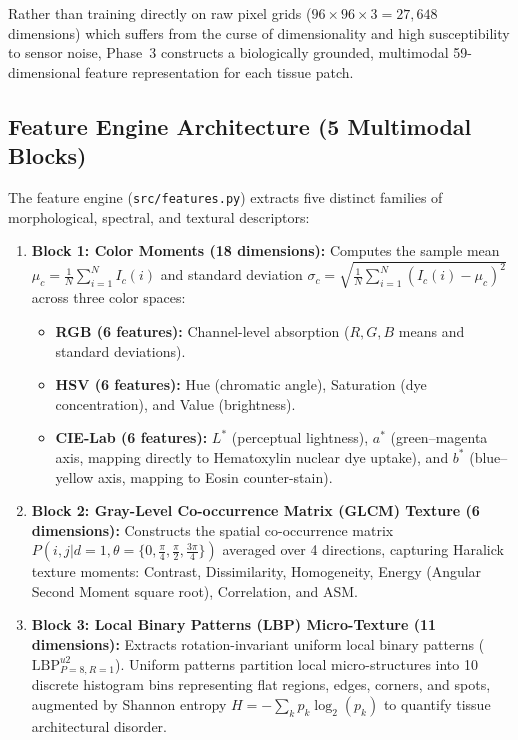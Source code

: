 \documentclass[11pt,a4paper]{article}
\begin{document}
Rather than training directly on raw pixel grids ($96 \times 96 \times 3 = 27,648$ dimensions) which suffers from the curse of dimensionality and high susceptibility to sensor noise, Phase~3 constructs a biologically grounded, multimodal 59-dimensional feature representation for each tissue patch.

\subsection{Feature Engine Architecture (5 Multimodal Blocks)}
The feature engine (\texttt{src/features.py}) extracts five distinct families of morphological, spectral, and textural descriptors:
\begin{enumerate}[leftmargin=*]
    \item \textbf{Block 1: Color Moments (18 dimensions):}
    Computes the sample mean $\mu_c = \frac{1}{N}\sum_{i=1}^N I_c(i)$ and standard deviation $\sigma_c = \sqrt{\frac{1}{N}\sum_{i=1}^N (I_c(i) - \mu_c)^2}$ across three color spaces:
    \begin{itemize}[noitemsep]
        \item \textbf{RGB (6 features):} Channel-level absorption ($R, G, B$ means and standard deviations).
        \item \textbf{HSV (6 features):} Hue (chromatic angle), Saturation (dye concentration), and Value (brightness).
        \item \textbf{CIE-Lab (6 features):} $L^*$ (perceptual lightness), $a^*$ (green--magenta axis, mapping directly to Hematoxylin nuclear dye uptake), and $b^*$ (blue--yellow axis, mapping to Eosin counter-stain).
    \end{itemize}
    
    \item \textbf{Block 2: Gray-Level Co-occurrence Matrix (GLCM) Texture (6 dimensions):}
    Constructs the spatial co-occurrence matrix $P(i,j | d=1, \theta=\{0, \frac{\pi}{4}, \frac{\pi}{2}, \frac{3\pi}{4}\})$ averaged over 4 directions, capturing Haralick texture moments: Contrast, Dissimilarity, Homogeneity, Energy (Angular Second Moment square root), Correlation, and ASM.
    
    \item \textbf{Block 3: Local Binary Patterns (LBP) Micro-Texture (11 dimensions):}
    Extracts rotation-invariant uniform local binary patterns ($\text{LBP}_{P=8, R=1}^{u2}$). Uniform patterns partition local micro-structures into 10 discrete histogram bins representing flat regions, edges, corners, and spots, augmented by Shannon entropy $H = -\sum_{k} p_k \log_2(p_k)$ to quantify tissue architectural disorder.
    

\end{enumerate}
\end{document}
